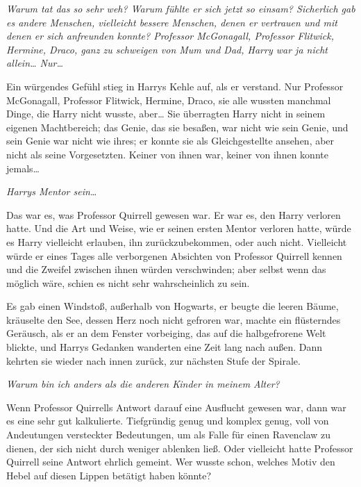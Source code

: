 {\emph{Warum tat das so sehr weh? Warum fühlte er sich jetzt so einsam? Sicherlich gab es andere Menschen, vielleicht bessere Menschen, denen er vertrauen und mit denen er sich anfreunden konnte? Professor McGonagall, Professor Flitwick, Hermine, Draco, ganz zu schweigen von Mum und Dad, Harry war ja nicht allein… Nur…}

Ein würgendes Gefühl stieg in Harrys Kehle auf, als er verstand. Nur Professor McGonagall, Professor Flitwick, Hermine, Draco, sie alle wussten manchmal Dinge, die Harry nicht wusste, aber… Sie überragten Harry nicht in seinem eigenen Machtbereich; das Genie, das sie besaßen, war nicht wie sein Genie, und sein Genie war nicht wie ihres; er konnte sie als Gleichgestellte ansehen, aber nicht als seine Vorgesetzten. Keiner von ihnen war, keiner von ihnen konnte jemals…

\emph{Harrys Mentor sein…}

Das war es, was Professor Quirrell gewesen war. Er war es, den Harry verloren hatte. Und die Art und Weise, wie er seinen ersten Mentor verloren hatte, würde es Harry vielleicht erlauben, ihn zurückzubekommen, oder auch nicht. Vielleicht würde er eines Tages alle verborgenen Absichten von Professor Quirrell kennen und die Zweifel zwischen ihnen würden verschwinden; aber selbst wenn das möglich wäre, schien es nicht sehr wahrscheinlich zu sein.

Es gab einen Windstoß, außerhalb von Hogwarts, er beugte die leeren Bäume, kräuselte den See, dessen Herz noch nicht gefroren war, machte ein flüsterndes Geräusch, als er an dem Fenster vorbeiging, das auf die halbgefrorene Welt blickte, und Harrys Gedanken wanderten eine Zeit lang nach außen. Dann kehrten sie wieder nach innen zurück, zur nächsten Stufe der Spirale.

\emph{Warum bin ich anders als die anderen Kinder in meinem Alter?}

Wenn Professor Quirrells Antwort darauf eine Ausflucht gewesen war, dann war es eine sehr gut kalkulierte. Tiefgründig genug und komplex genug, voll von Andeutungen versteckter Bedeutungen, um als Falle für einen Ravenclaw zu dienen, der sich nicht durch weniger ablenken ließ. Oder vielleicht hatte Professor Quirrell seine Antwort ehrlich gemeint. Wer wusste schon, welches Motiv den Hebel auf diesen Lippen betätigt haben könnte?

}
